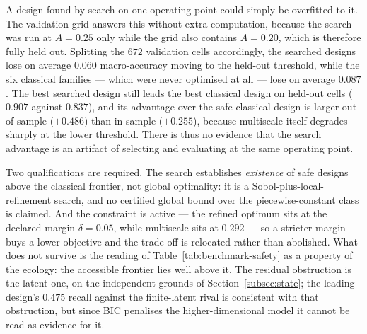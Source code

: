 A design found by search on one operating point could simply be overfitted to it. The validation grid answers this without extra computation, because the search was run at $A=0.25$ only while the grid also contains $A=0.20$, which is therefore fully held out. Splitting the $672$ validation cells accordingly, the searched designs lose on average $0.060$ macro-accuracy moving to the held-out threshold, while the six classical families --- which were never optimised at all --- lose on average $0.087$. The best searched design still leads the best classical design on held-out cells ($0.907$ against $0.837$), and its advantage over the safe classical design is larger out of sample ($+0.486$) than in sample ($+0.255$), because multiscale itself degrades sharply at the lower threshold. There is thus no evidence that the search advantage is an artifact of selecting and evaluating at the same operating point.

Two qualifications are required. The search establishes \emph{existence} of safe designs above the classical frontier, not global optimality: it is a Sobol-plus-local-refinement search, and no certified global bound over the piecewise-constant class is claimed. And the constraint is active --- the refined optimum sits at the declared margin $\delta=0.05$, while multiscale sits at $0.292$ --- so a stricter margin buys a lower objective and the trade-off is relocated rather than abolished. What does not survive is the reading of Table~\ref{tab:benchmark-safety} as a property of the ecology: the accessible frontier lies well above it. The residual obstruction is the latent one, on the independent grounds of Section~\ref{subsec:state}; the leading design's $0.475$ recall against the finite-latent rival is consistent with that obstruction, but since BIC penalises the higher-dimensional model it cannot be read as evidence for it.
